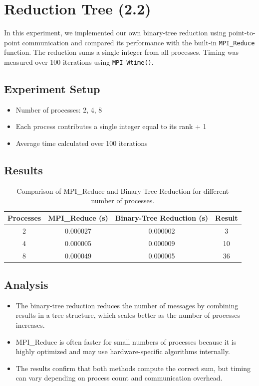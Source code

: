 \documentclass[a4paper,12pt]{article}
\begin{document}
\section{Reduction Tree (2.2)}

In this experiment, we implemented our own binary-tree reduction using point-to-point communication and compared its performance with the built-in \texttt{MPI\_Reduce} function. The reduction sums a single integer from all processes. Timing was measured over 100 iterations using \texttt{MPI\_Wtime()}.

\subsection{Experiment Setup}
\begin{itemize}
    \item Number of processes: 2, 4, 8
    \item Each process contributes a single integer equal to its rank + 1
    \item Average time calculated over 100 iterations
\end{itemize}

\subsection{Results}

\begin{table}[h!]
\centering
\begin{tabular}{|c|c|c|c|}
\hline
\textbf{Processes} & \textbf{MPI\_Reduce (s)} & \textbf{Binary-Tree Reduction (s)} & \textbf{Result} \\
\hline
2 & 0.000027 & 0.000002 & 3 \\
4 & 0.000005 & 0.000009 & 10 \\
8 & 0.000049 & 0.000005 & 36 \\
\hline
\end{tabular}
\caption{Comparison of MPI\_Reduce and Binary-Tree Reduction for different number of processes.}
\end{table}

\subsection{Analysis}

\begin{itemize}
    \item The binary-tree reduction reduces the number of messages by combining results in a tree structure, which scales better as the number of processes increases.
    \item MPI\_Reduce is often faster for small numbers of processes because it is highly optimized and may use hardware-specific algorithms internally.
    \item The results confirm that both methods compute the correct sum, but timing can vary depending on process count and communication overhead.
\end{itemize}
\end{document}

